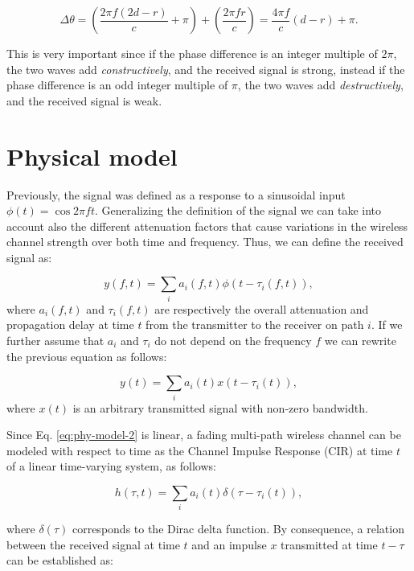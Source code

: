 \documentclass[binding=0.6cm,noexaminfo]{sapthesis}
\begin{document}
\begin{equation}
\Delta\theta = \left( \frac{2 \pi f (2d - r)}{c} + \pi \right) + \left( \frac{2 \pi f r}{c} \right) = \frac{4 \pi f}{c} (d - r) + \pi.
\end{equation}

This is very important since if the phase difference is an integer multiple of $2 \pi$, the two waves add \textit{constructively}, and the received signal is strong, instead if the phase difference is an odd integer multiple of $\pi$, the two waves add \textit{destructively}, and the received signal is weak.

\section{Physical model}\label{sec:phy-model}

Previously, the signal was defined as a response to a sinusoidal input $\phi(t) = \cos 2 \pi f t$. Generalizing the definition of the signal we can take into account also the different attenuation factors that cause variations in the wireless channel strength over both time and frequency. Thus, we can define the received signal as:

\begin{equation}
y(f, t) = \sum_i a_i (f, t) \phi (t - \tau_i(f,t)),
\label{eq:phy-model-1}
\end{equation}
where $a_i(f,t)$ and $\tau_i(f,t)$ are respectively the overall attenuation and propagation delay at time $t$ from the transmitter to the receiver on path $i$. If we further assume that $a_i$ and $\tau_i$ do not depend on the frequency $f$ we can rewrite the previous equation as follows:

\begin{equation}
y(t) = \sum_i a_i (t) x(t - \tau_i(t)),
\label{eq:phy-model-2}
\end{equation}
where $x(t)$ is an arbitrary transmitted signal with non-zero bandwidth.

Since Eq. \ref{eq:phy-model-2} is linear, a fading multi-path wireless channel can be modeled with respect to time as the Channel Impulse Response (CIR) at time $t$ of a linear time-varying system, as follows:

\begin{equation}
h(\tau, t) =  \sum_i a_i (t) \delta(\tau - \tau_i(t)),
\label{eq:phy-model-3}
\end{equation}

where $\delta(\tau)$ corresponds to the Dirac delta function. By consequence, a relation between the received signal at time $t$ and an impulse $x$ transmitted at time $t - \tau$ can be established as:
\end{document}
